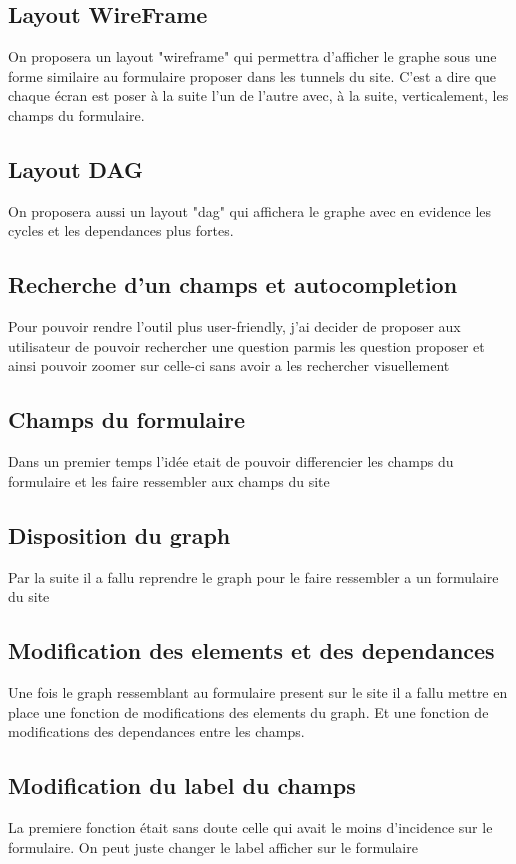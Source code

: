 \subsection{Layout WireFrame}
On proposera un layout "wireframe" qui permettra d'afficher le graphe sous une forme similaire au formulaire proposer dans les tunnels du site. C'est a dire que chaque écran est poser à la suite l'un de l'autre avec, à la suite, verticalement, les champs du formulaire.

\subsection{Layout DAG}
On proposera aussi un layout "dag" qui affichera le graphe avec en evidence les cycles et les dependances plus fortes.

\subsection{Recherche d’un champs et autocompletion}
Pour pouvoir rendre l’outil plus user-friendly, j’ai decider de proposer aux utilisateur de pouvoir rechercher une question parmis les question proposer et ainsi pouvoir zoomer sur celle-ci sans avoir a les rechercher visuellement

\subsection{Champs du formulaire}
Dans un premier temps l’idée etait de pouvoir differencier les champs du formulaire et les faire ressembler aux champs du site

\subsection{Disposition du graph}
Par la suite il a fallu reprendre le graph pour le faire ressembler a un formulaire du site

\subsection{Modification des elements et des dependances}
Une fois le graph ressemblant au formulaire present sur le site il a fallu mettre en place une fonction de modifications des elements du graph. Et une fonction de modifications des dependances entre les champs.

\subsection{Modification du label du champs}
La premiere fonction était sans doute celle qui avait le moins d’incidence sur le formulaire. On peut juste changer le label afficher sur le formulaire

